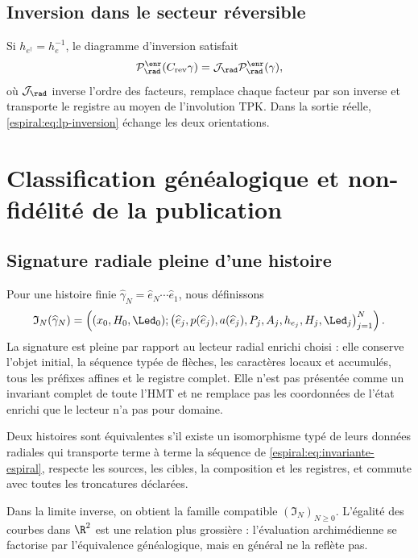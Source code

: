 \section{Inversion dans le secteur réversible}

Si \(h_{e^\dagger}=h_e^{-1}\), le diagramme d'inversion satisfait
\[
 \mathcal P_{\rad}^{\enr}(C_{\mathrm{rev}}\gamma)
 =\mathcal J_{\rad}
 \mathcal P_{\rad}^{\enr}(\gamma),
\]
où \(\mathcal J_{\rad}\) inverse l'ordre des facteurs, remplace chaque facteur par son inverse et transporte le registre au moyen de l'involution TPK. Dans la sortie réelle, \cref{espiral:eq:lp-inversion} échange les deux orientations.

\chapter{Classification généalogique et non-fidélité de la publication}

\section{Signature radiale pleine d'une histoire}

Pour une histoire finie \(\widehat\gamma_N=\widehat e_N\cdots\widehat e_1\), nous définissons
\begin{equation}
 \mathfrak I_N(\widehat\gamma_N)=
 \left(
 (x_0,H_0,\Led_0);
 \bigl(\widehat e_j,p(\widehat e_j),a(\widehat e_j),P_j,A_j,
 h_{e_j},H_j,\Led_j\bigr)_{j=1}^{N}
 \right).
 \label{espiral:eq:invariante-espiral}
\end{equation}
La signature est pleine par rapport au lecteur radial enrichi choisi : elle conserve l'objet initial, la séquence typée de flèches, les caractères locaux et accumulés, tous les préfixes affines et le registre complet. Elle n'est pas présentée comme un invariant complet de toute l'HMT et ne remplace pas les coordonnées de l'état enrichi que le lecteur n'a pas pour domaine.

\begin{definition}
Deux histoires sont équivalentes s'il existe un isomorphisme typé de leurs données radiales qui transporte terme à terme la séquence de \cref{espiral:eq:invariante-espiral}, respecte les sources, les cibles, la composition et les registres, et commute avec toutes les troncatures déclarées.
\end{definition}

Dans la limite inverse, on obtient la famille compatible \((\mathfrak I_N)_{N\ge0}\). L'égalité des courbes dans \(\R^2\) est une relation plus grossière : l'évaluation archimédienne se factorise par l'équivalence généalogique, mais en général ne la reflète pas.

